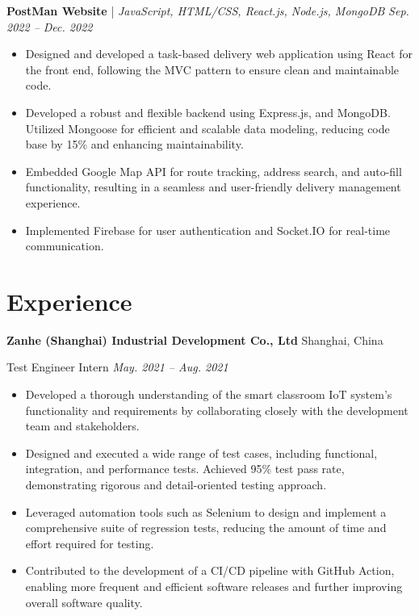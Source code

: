\documentclass[hidelinks, 12pt,letterpaper]{article}
\newcommand{\resumeItemListStart}{
    \begin{itemize}[itemsep=1pt, parsep=0pt, topsep=0pt]
}
\newcommand{\resumeItemListEnd}{
    \end{itemize}
}
\begin{document}
\textbf{PostMan Website} | \emph{JavaScript, HTML/CSS, React.js, Node.js, MongoDB} \hfill \textit{Sep. 2022 -- Dec. 2022}

\resumeItemListStart
    \item Designed and developed a task-based delivery web application using React for the front end, following the MVC pattern to ensure clean and maintainable code.
    \item Developed a robust and flexible backend using Express.js, and MongoDB. Utilized Mongoose for efficient and scalable data modeling, reducing code base by 15\% and enhancing maintainability.
    \item Embedded Google Map API for route tracking, address search, and auto-fill functionality, resulting in a seamless and user-friendly delivery management experience. 
    \item Implemented Firebase for user authentication and Socket.IO for real-time communication.
\resumeItemListEnd

\section{Experience}

\textbf{Zanhe (Shanghai) Industrial Development Co., Ltd} \hfill Shanghai, China

Test Engineer Intern \hfill \textit{May. 2021 -- Aug. 2021}

\resumeItemListStart
	\item Developed a thorough understanding of the smart classroom IoT system's functionality and requirements by collaborating closely with the development team and stakeholders.
        \item Designed and executed a wide range of test cases, including functional, integration, and performance tests. Achieved 95\% test pass rate, demonstrating rigorous and detail-oriented testing approach.
        \item Leveraged automation tools such as Selenium to design and implement a comprehensive suite of regression tests, reducing the amount of time and effort required for testing.
        \item Contributed to the development of a CI/CD pipeline with GitHub Action, enabling more frequent and efficient software releases and further improving overall software quality.
\resumeItemListEnd

	
\end{document}
